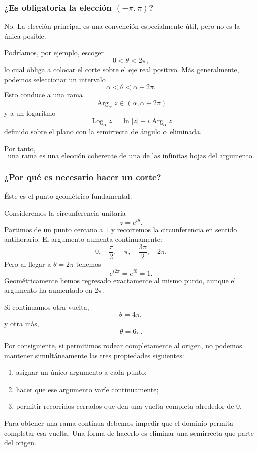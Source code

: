 \documentclass[12pt]{article}
\DeclareMathOperator{\Arg}{Arg}
\DeclareMathOperator{\Log}{Log}
\begin{document}
\subsubsection*{¿Es obligatoria la elección $(-\pi,\pi)$?}
No. La elección principal es una convención especialmente útil, pero no es la
única posible.

Podríamos, por ejemplo, escoger
\[
0<\theta<2\pi,
\]
lo cual obliga a colocar el corte sobre el eje real positivo. Más generalmente,
podemos seleccionar un intervalo
\[
\alpha<\theta<\alpha+2\pi.
\]
Esto conduce a una rama
\[
\Arg_\alpha z\in(\alpha,\alpha+2\pi)
\]
y a un logaritmo
\[
\Log_\alpha z
=
\ln|z|+i\Arg_\alpha z
\]
definido sobre el plano con la semirrecta de ángulo $\alpha$ eliminada.

Por tanto,
\[
\boxed{
\text{una rama es una elección coherente de una de las infinitas hojas
del argumento.}
}
\]
\subsubsection*{¿Por qué es necesario hacer un corte?}
Éste es el punto geométrico fundamental.

Consideremos la circunferencia unitaria
\[
z=e^{i\theta}.
\]
Partimos de un punto cercano a $1$ y recorremos la circunferencia en sentido
antihorario. El argumento aumenta continuamente:
\[
0,\quad
\frac{\pi}{2},\quad
\pi,\quad
\frac{3\pi}{2},\quad
2\pi.
\]
Pero al llegar a $\theta=2\pi$ tenemos
\[
e^{i2\pi}=e^{i0}=1.
\]
Geométricamente hemos regresado exactamente al mismo punto, aunque el argumento
ha aumentado en $2\pi$.

Si continuamos otra vuelta,
\[
\theta=4\pi,
\]
y otra más,
\[
\theta=6\pi.
\]

Por consiguiente, si permitimos rodear completamente al origen, no podemos
mantener simultáneamente las tres propiedades siguientes:

\begin{enumerate}
\item asignar un único argumento a cada punto;
\item hacer que ese argumento varíe continuamente;
\item permitir recorridos cerrados que den una vuelta completa alrededor de
$0$.
\end{enumerate}

Para obtener una rama continua debemos impedir que el dominio permita completar
esa vuelta. Una forma de hacerlo es eliminar una semirrecta que parte del
origen.
\end{document}
